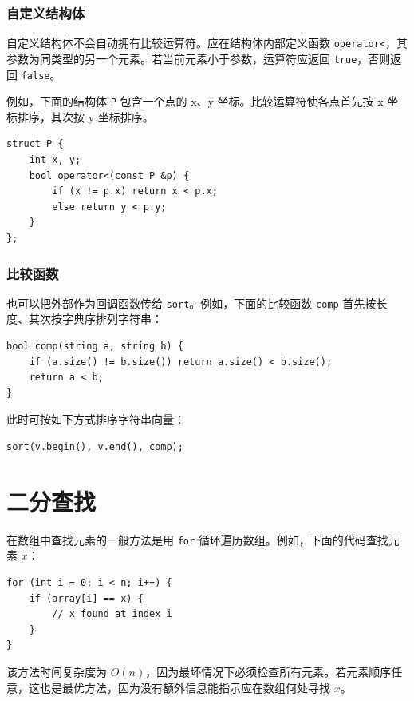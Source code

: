 \subsubsection{自定义结构体}

自定义结构体不会自动拥有比较运算符。应在结构体内部定义函数 \texttt{operator<}，其参数为同类型的另一个元素。若当前元素小于参数，运算符应返回 \texttt{true}，否则返回 \texttt{false}。

例如，下面的结构体 \texttt{P} 包含一个点的 x、y 坐标。比较运算符使各点首先按 x 坐标排序，其次按 y 坐标排序。

\begin{lstlisting}
struct P {
    int x, y;
    bool operator<(const P &p) {
        if (x != p.x) return x < p.x;
        else return y < p.y;
    }
};
\end{lstlisting}

\subsubsection{比较函数}


也可以把外部作为回调函数传给 \texttt{sort}。例如，下面的比较函数 \texttt{comp} 首先按长度、其次按字典序排列字符串：

\begin{lstlisting}
bool comp(string a, string b) {
    if (a.size() != b.size()) return a.size() < b.size();
    return a < b;
}
\end{lstlisting}
此时可按如下方式排序字符串向量：
\begin{lstlisting}
sort(v.begin(), v.end(), comp);
\end{lstlisting}

\section{二分查找}


在数组中查找元素的一般方法是用 \texttt{for} 循环遍历数组。例如，下面的代码查找元素 $x$：

\begin{lstlisting}
for (int i = 0; i < n; i++) {
    if (array[i] == x) {
        // x found at index i
    }
}
\end{lstlisting}

该方法时间复杂度为 $O(n)$，因为最坏情况下必须检查所有元素。若元素顺序任意，这也是最优方法，因为没有额外信息能指示应在数组何处寻找 $x$。

